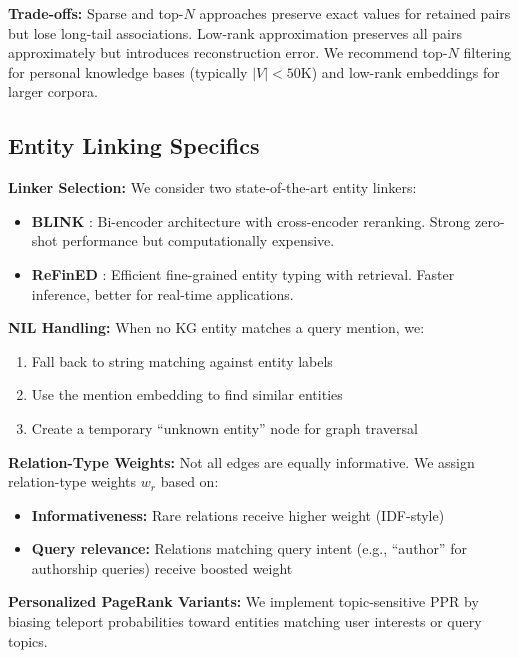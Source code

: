 \documentclass[11pt,a4paper]{article}
\begin{document}
\textbf{Trade-offs:} Sparse and top-$N$ approaches preserve exact values for retained pairs but lose long-tail associations. Low-rank approximation preserves all pairs approximately but introduces reconstruction error. We recommend top-$N$ filtering for personal knowledge bases (typically $|V| < 50$K) and low-rank embeddings for larger corpora.

\subsection{Entity Linking Specifics}
\label{sec:entity_linking}

\textbf{Linker Selection:} We consider two state-of-the-art entity linkers:
\begin{itemize}
    \item \textbf{BLINK} \citep{wu2020blink}: Bi-encoder architecture with cross-encoder reranking. Strong zero-shot performance but computationally expensive.
    \item \textbf{ReFinED} \citep{ayoola2022refined}: Efficient fine-grained entity typing with retrieval. Faster inference, better for real-time applications.
\end{itemize}

\textbf{NIL Handling:} When no KG entity matches a query mention, we:
\begin{enumerate}
    \item Fall back to string matching against entity labels
    \item Use the mention embedding to find similar entities
    \item Create a temporary ``unknown entity'' node for graph traversal
\end{enumerate}

\textbf{Relation-Type Weights:} Not all edges are equally informative. We assign relation-type weights $w_r$ based on:
\begin{itemize}
    \item \textbf{Informativeness:} Rare relations receive higher weight (IDF-style)
    \item \textbf{Query relevance:} Relations matching query intent (e.g., ``author'' for authorship queries) receive boosted weight
\end{itemize}

\textbf{Personalized PageRank Variants:} We implement topic-sensitive PPR \citep{haveliwala2003topic} by biasing teleport probabilities toward entities matching user interests or query topics.
\end{document}
